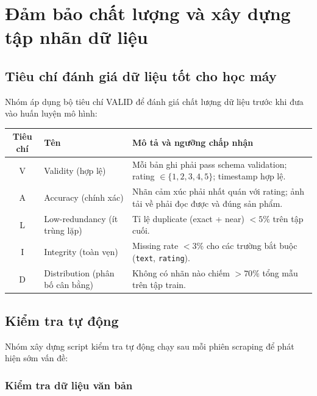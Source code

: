 \section{Đảm bảo chất lượng và xây dựng tập nhãn dữ liệu}

\subsection{Tiêu chí đánh giá dữ liệu tốt cho học máy}

Nhóm áp dụng bộ tiêu chí VALID để đánh giá chất lượng dữ liệu trước khi đưa vào huấn luyện mô hình:

\begin{center}
\renewcommand{\arraystretch}{1.5}
\begin{tabularx}{\textwidth}{|c|l|X|}
\hline
\rowcolor[HTML]{E8E8E8}
\textbf{Tiêu chí} & \textbf{Tên} & \textbf{Mô tả và ngưỡng chấp nhận} \\
\hline
V & Validity (hợp lệ) & Mỗi bản ghi phải pass schema validation; rating $\in \{1,2,3,4,5\}$; timestamp hợp lệ. \\
\hline
A & Accuracy (chính xác) & Nhãn cảm xúc phải nhất quán với rating; ảnh tải về phải đọc được và đúng sản phẩm. \\
\hline
L & Low-redundancy (ít trùng lặp) & Tỉ lệ duplicate (exact + near) $< 5\%$ trên tập cuối. \\
\hline
I & Integrity (toàn vẹn) & Missing rate $< 3\%$ cho các trường bắt buộc (\texttt{text}, \texttt{rating}). \\
\hline
D & Distribution (phân bố cân bằng) & Không có nhãn nào chiếm $> 70\%$ tổng mẫu trên tập train. \\
\hline
\end{tabularx}
\end{center}

\subsection{Kiểm tra tự động}

Nhóm xây dựng script kiểm tra tự động chạy sau mỗi phiên scraping để phát hiện sớm vấn đề:

\subsubsection{Kiểm tra dữ liệu văn bản}

